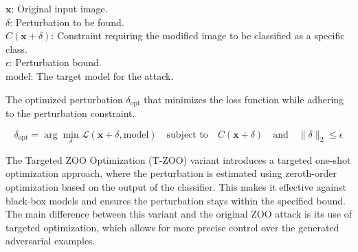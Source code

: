 $\mathbf{x}$: Original input image. \\
$\delta$: Perturbation to be found. \\
$C(\mathbf{x} + \delta)$: Constraint requiring the modified image to be classified as a specific class. \\
$\epsilon$: Perturbation bound. \\
$\text{model}$: The target model for the attack.

The optimized perturbation $\delta_{\text{opt}}$ that minimizes the loss function while adhering to the perturbation constraint.

\[
\delta_{\text{opt}} = \arg \min_{\delta} \mathcal{L}(\mathbf{x} + \delta, \text{model}) \quad \text{subject to} \quad C(\mathbf{x} + \delta) \quad \text{and} \quad \|\delta\|_2 \leq \epsilon
\]


The Targeted ZOO Optimization (T-ZOO) variant introduces a targeted one-shot optimization approach, where the perturbation is estimated using zeroth-order optimization based on the output of the classifier. This makes it effective against black-box models and ensures the perturbation stays within the specified bound. The main difference between this variant and the original ZOO attack is its use of targeted optimization, which allows for more precise control over the generated adversarial examples.